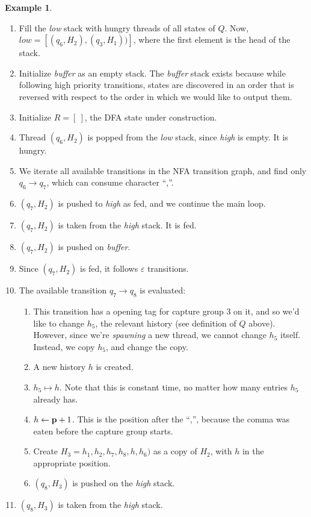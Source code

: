 \documentclass[english]{sigplanconf}
\theoremstyle{definition}
\newtheorem{example}{Example}[section]
\begin{document}
\begin{example}
\begin{enumerate}
\item Fill the \emph{low} stack with hungry threads of all states of $Q$.
Now, $\mathit{low}=[(q_6, H_2), (q_3, H_1))]$, where the first element is the head of the stack.
\item Initialize \emph{buffer} as an empty stack. 
The \emph{buffer} stack exists because while following high priority transitions, states are discovered
in an order that is reversed with respect to the order in which we would like to output them.
\item Initialize $R=[\ ]$, the DFA state under construction.
\item Thread $(q_6,H_2)$ is popped from the \emph{low} stack, since \emph{high} is empty. It is hungry.
\item We iterate all available transitions in the NFA transition graph, and find only $q_6\rightarrow q_7$, which can consume character ``,''.
\item $(q_7, H_2)$ is pushed to \emph{high} as fed, and we continue the main loop.
\item $(q_7, H_2)$ is taken from the \emph{high} stack. It is fed.
\item $(q_7, H_2)$ is pushed on \emph{buffer}.
\item Since $(q_7, H_2)$ is fed, it follows $\varepsilon$ transitions.
\item The available transition $q_7\rightarrow q_8$ is evaluated:\begin{enumerate}
	\item 	This transition has a opening tag for capture group 3 on it, and so we'd like to change $h_5$, 
		the relevant history (see definition of $Q$ above). However, since we're \emph{spawning} a new thread, we cannot change $h_5$ itself.
		Instead, we copy $h_5$, and change the copy.
	\item	A new history $h$ is created.
	\item 	$h_5 \mapsto h$. Note that this is constant time, no matter how many entries $h_5$ already has.
	\item 	$h\leftarrow\mathbf{\mathbf{p}}+1$. This is the position after the ``,'', because the comma was eaten before the capture
			group starts.
	\item	Create $H_3 = h_1, h_2, h_7, h_8, h, h_6)$ as a copy of $H_2$, with $h$ in the appropriate position.
	\item $(q_8, H_3)$ is pushed on the \emph{high} stack.
\end{enumerate}
\item $(q_8, H_3)$ is taken from the \emph{high} stack.

\end{enumerate}
\end{example}
\end{document}
